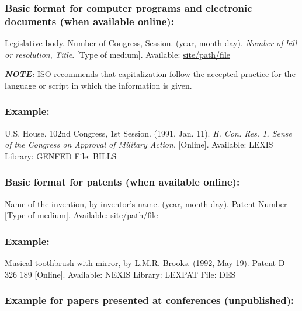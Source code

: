 \documentclass{IEEEoj}
\begin{document}
\subsubsection*{Basic format for computer programs and electronic documents (when available online): }

\begin{thebibliography}{00}
 Legislative body. Number of Congress, Session. (year, month day). \textit{Number of bill or resolution}, \textit{Title}. [Type
of medium]. Available: \underline{site/path/file}
\end{thebibliography}

{\bfseries\itshape NOTE:} ISO recommends that capitalization follow the
accepted practice for the language or script in which the information is
given.

\subsubsection*{Example:}

\begin{thebibliography}{00}
 U.S. House. 102nd Congress, 1st Session. (1991, Jan. 11). \textit{H. Con. Res. 1, Sense of the Congress on Approval of Military Action}. [Online]. Available: LEXIS Library: GENFED File: BILLS
\end{thebibliography}

\subsubsection*{Basic format for patents (when available online):}

\begin{thebibliography}{00}
 Name of the invention, by inventor's name. (year, month day). Patent Number [Type
of medium]. Available: \underline{site/path/file}
\end{thebibliography}

\subsubsection*{Example:}

\begin{thebibliography}{00}
 Musical toothbrush with mirror, by L.M.R. Brooks. (1992, May 19). Patent D 326 189 [Online]. Available: NEXIS Library: LEXPAT File: DES
\end{thebibliography}

\subsubsection*{Example for papers presented at conferences (unpublished):}
\end{document}
